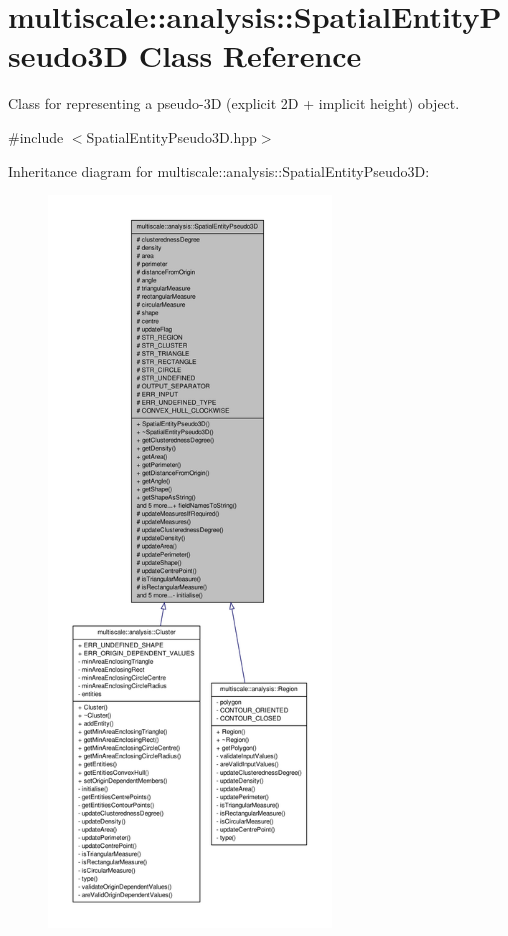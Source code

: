 \hypertarget{classmultiscale_1_1analysis_1_1SpatialEntityPseudo3D}{\section{multiscale\-:\-:analysis\-:\-:\-Spatial\-Entity\-Pseudo3\-D \-Class \-Reference}
\label{classmultiscale_1_1analysis_1_1SpatialEntityPseudo3D}
}


\-Class for representing a pseudo-\/3\-D (explicit 2\-D + implicit height) object.  




{\ttfamily \#include $<$\-Spatial\-Entity\-Pseudo3\-D.\-hpp$>$}



\-Inheritance diagram for multiscale\-:\-:analysis\-:\-:\-Spatial\-Entity\-Pseudo3\-D\-:
\nopagebreak
\begin{figure}[H]
\begin{center}
\leavevmode
\includegraphics[height=550pt]{classmultiscale_1_1analysis_1_1SpatialEntityPseudo3D__inherit__graph}
\end{center}
\end{figure}



